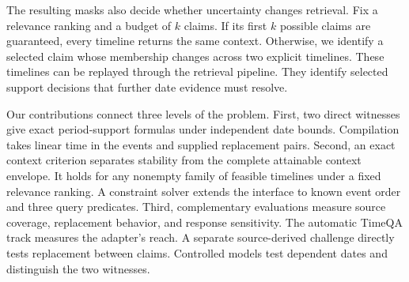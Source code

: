The resulting masks also decide whether uncertainty changes retrieval.
Fix a relevance ranking and a budget of $k$ claims.
If its first $k$ possible claims are guaranteed, every timeline returns the same context.
Otherwise, we identify a selected claim whose membership changes across two explicit timelines.
These timelines can be replayed through the retrieval pipeline.
They identify selected support decisions that further date evidence must resolve.

Our contributions connect three levels of the problem.
First, two direct witnesses give exact period-support formulas under independent date bounds.
Compilation takes linear time in the events and supplied replacement pairs.
Second, an exact context criterion separates stability from the complete attainable context envelope.
It holds for any nonempty family of feasible timelines under a fixed relevance ranking.
A constraint solver extends the interface to known event order and three query predicates.
Third, complementary evaluations measure source coverage, replacement behavior, and response sensitivity.
The automatic TimeQA track measures the adapter's reach.
A separate source-derived challenge directly tests replacement between claims.
Controlled models test dependent dates and distinguish the two witnesses.
